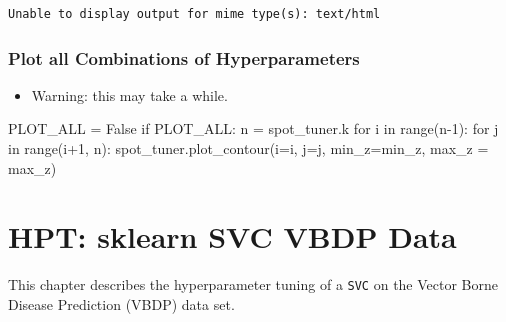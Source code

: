 \documentclass[
  letterpaper,
  DIV=11,
  numbers=noendperiod]{scrreprt}
\newenvironment{Shaded}{\begin{snugshade}}{\end{snugshade}}
\newcommand{\BuiltInTok}[1]{\textcolor[rgb]{0.00,0.23,0.31}{#1}}
\newcommand{\ControlFlowTok}[1]{\textcolor[rgb]{0.00,0.23,0.31}{#1}}
\newcommand{\DecValTok}[1]{\textcolor[rgb]{0.68,0.00,0.00}{#1}}
\newcommand{\KeywordTok}[1]{\textcolor[rgb]{0.00,0.23,0.31}{#1}}
\newcommand{\NormalTok}[1]{\textcolor[rgb]{0.00,0.23,0.31}{#1}}
\newcommand{\OperatorTok}[1]{\textcolor[rgb]{0.37,0.37,0.37}{#1}}
\newcommand{\VariableTok}[1]{\textcolor[rgb]{0.07,0.07,0.07}{#1}}
\providecommand{\tightlist}{%
  \setlength{\itemsep}{0pt}\setlength{\parskip}{0pt}}\usepackage{longtable,booktabs,array}
\begin{document}
\begin{verbatim}
Unable to display output for mime type(s): text/html
\end{verbatim}

\hypertarget{plot-all-combinations-of-hyperparameters-3}{%
\subsection{Plot all Combinations of
Hyperparameters}\label{plot-all-combinations-of-hyperparameters-3}}

\begin{itemize}
\tightlist
\item
  Warning: this may take a while.
\end{itemize}

\begin{Shaded}
\begin{Highlighting}[]
\NormalTok{PLOT\_ALL }\OperatorTok{=} \VariableTok{False}
\ControlFlowTok{if}\NormalTok{ PLOT\_ALL:}
\NormalTok{    n }\OperatorTok{=}\NormalTok{ spot\_tuner.k}
    \ControlFlowTok{for}\NormalTok{ i }\KeywordTok{in} \BuiltInTok{range}\NormalTok{(n}\OperatorTok{{-}}\DecValTok{1}\NormalTok{):}
        \ControlFlowTok{for}\NormalTok{ j }\KeywordTok{in} \BuiltInTok{range}\NormalTok{(i}\OperatorTok{+}\DecValTok{1}\NormalTok{, n):}
\NormalTok{            spot\_tuner.plot\_contour(i}\OperatorTok{=}\NormalTok{i, j}\OperatorTok{=}\NormalTok{j, min\_z}\OperatorTok{=}\NormalTok{min\_z, max\_z }\OperatorTok{=}\NormalTok{ max\_z)}
\end{Highlighting}
\end{Shaded}

\hypertarget{sec-hpt-sklearn-svc-vbdp-data}{%
\chapter{HPT: sklearn SVC VBDP
Data}\label{sec-hpt-sklearn-svc-vbdp-data}}

This chapter describes the hyperparameter tuning of a \texttt{SVC} on
the Vector Borne Disease Prediction (VBDP) data set.
\end{document}

